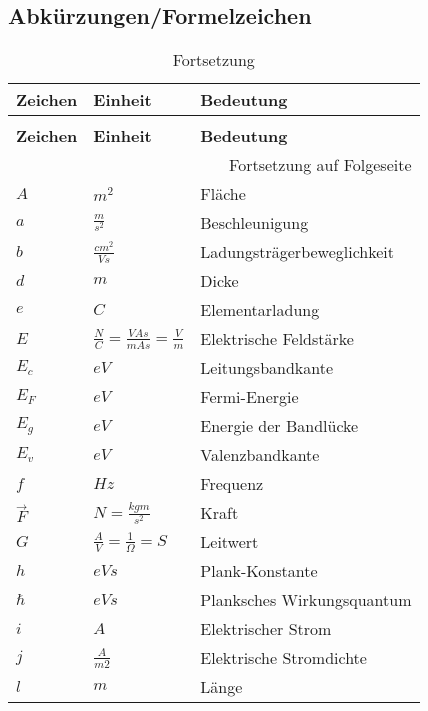 \documentclass[12pt,a4paper]{report}%
\numberwithin{equation}{section}
\begin{document}
	\subsection{Abkürzungen/Formelzeichen} \label{ch:names}
	\renewcommand{\arraystretch}{1.5}
	\begin{longtable} {|p{2cm}|p{3cm}|p{8.4cm}|} \hline
	\textbf{Zeichen} & \textbf{Einheit} & \textbf{Bedeutung} \\
	\hline
	\endfirsthead %
	\caption{Fortsetzung}\\ \hline
	\textbf{Zeichen} & \textbf{Einheit} & \textbf{Bedeutung} \\
	\hline
	\endhead %
	\multicolumn{3}{r}{Fortsetzung auf Folgeseite}\\
	\endfoot
	\hline
	\endlastfoot
	
	$A$ & $m^2$ & Fläche \\ \hline
	$a$ & $\frac{m}{s^2}$ & Beschleunigung \\ \hline
	$b$ & $\frac{cm^2}{Vs}$ & Ladungsträgerbeweglichkeit \\ \hline
	$d$ & $m$ & Dicke \\ \hline
	$e$ & $C$ & Elementarladung \\ \hline
	$E$ & $\frac{N}{C} = \frac{VAs}{mAs} = \frac{V}{m}$ & Elektrische Feldstärke \\ \hline
	$E_c$ & $eV$ & Leitungsbandkante \\ \hline
	$E_F$ & $eV$ & Fermi-Energie \\ \hline
	$E_g$ & $eV$ & Energie der Bandlücke \\ \hline
	$E_v$ & $eV$ & Valenzbandkante \\ \hline
	$f$ & $Hz$ & Frequenz \\ \hline
	$\vec{F}$ & $N = \frac{kgm}{s^2}$ & Kraft \\ \hline
	$G$ & $\frac{A}{V} = \frac{1}{\Omega} = S$ & Leitwert \\ \hline
	
	$h$ & $eVs$ & Plank-Konstante\\ \hline
	$\hbar$ & $eVs$ & Planksches Wirkungsquantum \\ \hline
	$i$ & $A$ & Elektrischer Strom \\ \hline
	$j$ & $\frac{A}{m2}$ & Elektrische Stromdichte \\ \hline
	$l$ & $m$ & Länge \\ \hline
	

\end{longtable}
\end{document}
